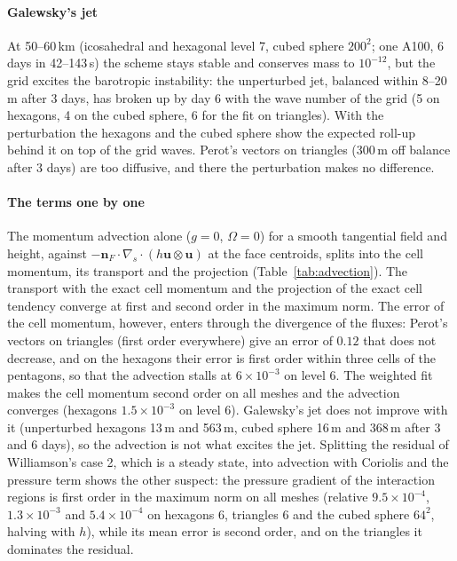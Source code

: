 \documentclass[preprint,12pt]{elsarticle}
\newcommand{\bn}{\mathbf{n}}
\newcommand{\bu}{\mathbf{u}}
\theoremstyle{definition}
\begin{document}
\paragraph{Galewsky's jet} At 50--60\,km (icosahedral and hexagonal level 7, cubed sphere $200^2$; one A100,
6 days in 42--143\,s) the scheme stays stable and conserves mass to $10^{-12}$, but the grid excites
the barotropic instability: the unperturbed jet, balanced within 8--20\,m after 3 days, has broken up by
day 6 with the wave number of the grid (5 on hexagons, 4 on the cubed sphere, 6 for the fit on
triangles). With the perturbation the hexagons and the cubed sphere show the expected roll-up behind
it on top of the grid waves. Perot's vectors on triangles (300\,m off balance after 3 days) are too
diffusive, and there the perturbation makes no difference.

\paragraph{The terms one by one} The momentum advection alone ($g=0$, $\Omega=0$) for a smooth
tangential field and height, against $-\bn_F\cdot\nabla_s\cdot(h\bu\otimes\bu)$ at the face centroids,
splits into the cell momentum, its transport and the projection (Table~\ref{tab:advection}). The
transport with the exact cell momentum and the projection of the exact cell tendency converge at
first and second order in the maximum norm. The error of the cell momentum, however, enters through
the divergence of the fluxes: Perot's vectors on triangles (first order everywhere) give an error of
$0.12$ that does not decrease, and on the hexagons their error is first order within three cells of
the pentagons, so that the advection stalls at $6\times10^{-3}$ on level 6. The weighted fit makes the
cell momentum second order on all meshes and the advection converges (hexagons $1.5\times10^{-3}$ on
level 6). Galewsky's jet does not improve with it (unperturbed hexagons 13\,m and 563\,m, cubed sphere
16\,m and 368\,m after 3 and 6 days), so the advection is not what excites the jet. Splitting the
residual of Williamson's case 2, which is a steady state, into advection with Coriolis
and the pressure term shows the other suspect: the pressure gradient of the interaction regions is
first order in the maximum norm on all meshes (relative $9.5\times10^{-4}$, $1.3\times10^{-3}$ and
$5.4\times10^{-4}$ on hexagons 6, triangles 6 and the cubed sphere $64^2$, halving with $h$), while its
mean error is second order, and on the triangles it dominates the residual.
\end{document}
